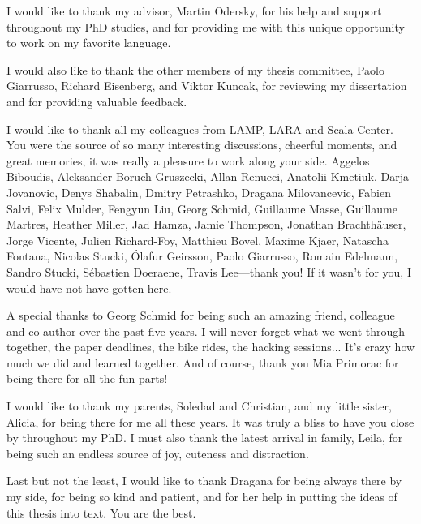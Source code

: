 I would like to thank my advisor, Martin Odersky, for his help and support throughout my PhD studies, and for providing me with this unique opportunity to work on my favorite language.

I would also like to thank the other members of my thesis committee, Paolo Giarrusso, Richard Eisenberg, and Viktor Kuncak, for reviewing my dissertation and for providing valuable feedback.

I would like to thank all my colleagues from LAMP, LARA and Scala Center.
You were the source of so many interesting discussions, cheerful moments, and great memories, it was really a pleasure to work along your side.
Aggelos Biboudis,
Aleksander Boruch-Gruszecki,
Allan Renucci,
Anatolii Kmetiuk,
Darja Jovanovic,
Denys Shabalin,
Dmitry Petrashko,
Dragana Milovancevic,
Fabien Salvi,
Felix Mulder,
Fengyun Liu,
Georg Schmid,
Guillaume Masse,
Guillaume Martres,
Heather Miller,
Jad Hamza,
Jamie Thompson,
Jonathan Brachthäuser,
Jorge Vicente,
Julien Richard-Foy,
Matthieu Bovel,
Maxime Kjaer,
Natascha Fontana,
Nicolas Stucki,
Ólafur Geirsson,
Paolo Giarrusso,
Romain Edelmann,
Sandro Stucki,
Sébastien Doeraene,
Travis Lee---thank you!
If it wasn't for you, I would have not have gotten here.

A special thanks to Georg Schmid for being such an amazing friend, colleague and co-author over the past five years.
I will never forget what we went through together, the paper deadlines, the bike rides, the hacking sessions...
It's crazy how much we did and learned together.
And of course, thank you Mia Primorac for being there for all the fun parts!

I would like to thank my parents, Soledad and Christian, and my little sister, Alicia, for being there for me all these years.
It was truly a bliss to have you close by throughout my PhD.
I must also thank the latest arrival in family, Leila, for being such an endless source of joy, cuteness and distraction.

Last but not the least, I would like to thank Dragana for being always there by my side, for being so kind and patient, and for her help in putting the ideas of this thesis into text.
You are the best.
